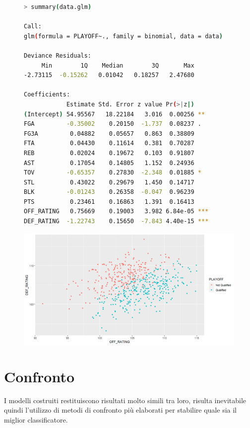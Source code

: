 \documentclass[11pt,a4paper]{article}
\begin{document}
\begin{figure}[h]
	\hspace{-2.30cm}
	\begin{minipage}{.57\textwidth} 
		\begin{lstlisting}[language=bash,basicstyle=\tiny,tabsize=2,frame = single]
> summary(data.glm)

Call:
glm(formula = PLAYOFF~., family = binomial, data = data)

Deviance Residuals: 
     Min        1Q    Median        3Q       Max  
-2.73115  -0.15262   0.01042   0.18257   2.47680  

Coefficients:
            Estimate Std. Error z value Pr(>|z|)    
(Intercept) 54.95567   18.22184   3.016  0.00256 ** 
FGA         -0.35002    0.20150  -1.737  0.08237 .  
FG3A         0.04882    0.05657   0.863  0.38809    
FTA          0.04430    0.11614   0.381  0.70287    
REB          0.02024    0.19672   0.103  0.91807    
AST          0.17054    0.14805   1.152  0.24936    
TOV         -0.65357    0.27830  -2.348  0.01885 *  
STL          0.43022    0.29679   1.450  0.14717    
BLK         -0.01243    0.26358  -0.047  0.96239    
PTS          0.23461    0.16863   1.391  0.16413    
OFF_RATING   0.75669    0.19003   3.982 6.84e-05 ***
DEF_RATING  -1.22743    0.15650  -7.843 4.40e-15 ***
        \end{lstlisting}
    \end{minipage}
	\begin{minipage}{0.5\textwidth} 
		\includegraphics[scale=.45]{imgs/OFF_RATING-DEF_RATING_plot.png}
	\end{minipage}
\end{figure}
\newpage

\section{Confronto}
I modelli costruiti restituiscono risultati molto simili tra loro, risulta inevitabile quindi l'utilizzo di metodi di confronto più elaborati per stabilire quale sia il miglior classificatore.
\end{document}
